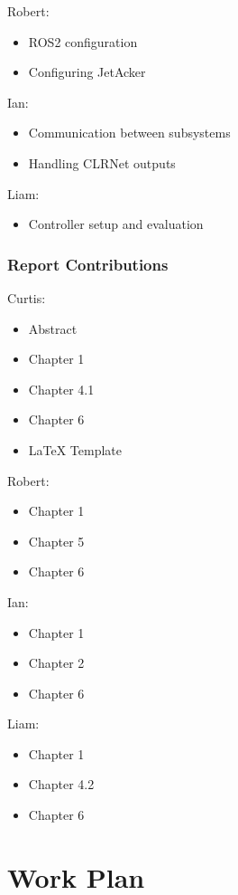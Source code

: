 \documentclass[titlepage]{article}
\begin{document}
Robert:
\begin{itemize}
	\item ROS2 configuration
	\item Configuring JetAcker
\end{itemize}

Ian:
\begin{itemize}
	\item Communication between subsystems
	\item Handling CLRNet outputs
\end{itemize}

Liam:
\begin{itemize}
	\item Controller setup and evaluation
\end{itemize}


\subsubsection{Report Contributions}
Curtis:
\begin{itemize}
	\item Abstract
	\item Chapter 1
	\item Chapter 4.1
	\item Chapter 6
	\item LaTeX Template
\end{itemize}

Robert:
\begin{itemize}
	\item Chapter 1
	\item Chapter 5
	\item Chapter 6
\end{itemize}

Ian:
\begin{itemize}
	\item Chapter 1
	\item Chapter 2
	\item Chapter 6
\end{itemize}

Liam:
\begin{itemize}
	\item Chapter 1
	\item Chapter 4.2
	\item Chapter 6
\end{itemize}

\section{Work Plan}
\end{document}
